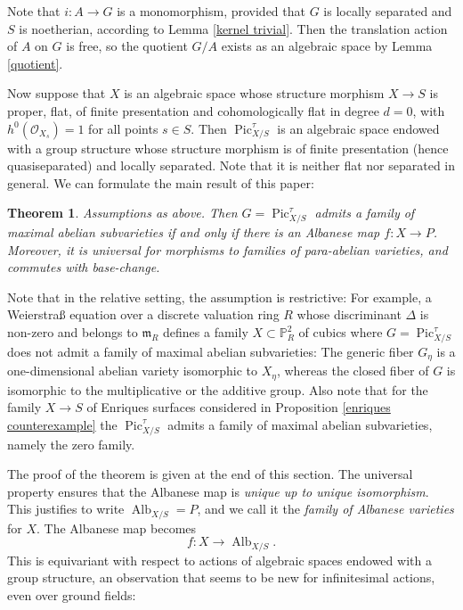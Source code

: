 \documentclass[oneside, 12pt]{amsart}
\newcommand\mylabel[1]{\label{#1}\marginpar{\raggedright\vspace{-1ex}\medskip\medskip\footnotesize \tt #1}}
\renewcommand\mylabel[1]{\label{#1}}
\newtheorem{theorem}{Theorem}[section]
\theoremstyle{definition}
\theoremstyle{remark}
\newcommand{\PP}{\mathbb{P}}
\newcommand{\Alb}{\operatorname{Alb}}
\newcommand{\lra}{\longrightarrow}
\newcommand{\maxid}{\mathfrak{m}}
\renewcommand{\O}{\mathscr{O}}
\newcommand{\Pic}{\operatorname{Pic}}
\newcommand{\ra}{\rightarrow}
\begin{document}
Note that $i:A\ra G$ is a  monomorphism, provided that $G$ is locally separated and $S$ is noetherian,
according to Lemma \ref{kernel trivial}. Then  the translation action of $A$ on $G$ is free,
so  the quotient $G/A$ exists as an algebraic space by Lemma \ref{quotient}.  

Now suppose that $X$ is an algebraic space whose structure morphism $X\ra S$ is  proper, flat, of finite presentation and  cohomologically flat
in degree $d=0$, with $h^0(\O_{X_s})=1$ for all points $s\in S$.  Then  $\Pic^\tau_{X/S}$ is an algebraic space endowed with a group structure
whose structure morphism is  of finite presentation (hence quasiseparated) and locally separated. Note that  it is neither flat nor separated in general.
We can formulate the main result of this paper:

\begin{theorem}
\mylabel{criterion albanese}
Assumptions as above. Then   $G=\Pic^\tau_{X/S}$ admits a   family of maximal abelian subvarieties if and only if 
there is an Albanese map $f:X\ra P$. Moreover, it is universal for morphisms  to families of para-abelian varieties,
and commutes with base-change.
\end{theorem}

Note that in the relative setting, the assumption is restrictive: For example, a Weierstra\ss{} equation
over a discrete valuation ring $R$ whose discriminant $\Delta$ is non-zero and belongs to $\maxid_R$
defines a family $X\subset\PP^2_R$ of cubics where $G=\Pic^\tau_{X/S}$ does not  admit a family of maximal abelian subvarieties:
The generic fiber $G_\eta$ is a one-dimensional abelian variety isomorphic to $X_\eta$, 
whereas the closed fiber of $G$ is isomorphic to the multiplicative or the additive group.
Also note that for the family $X\ra S$ of Enriques surfaces considered in Proposition \ref{enriques counterexample} 
the $\Pic^\tau_{X/S}$ admits a family of maximal abelian subvarieties, namely the zero family.

The proof  of the theorem  is given at the end of this section.
The universal property ensures that the Albanese map is \emph{unique up to unique isomorphism}.
This justifies to write $ \Alb_{X/S}=P$, and we call it  the \emph{family of Albanese varieties}
for $X$. The   Albanese map becomes
$$
f:X\lra \Alb_{X/S}.
$$
This is equivariant  with respect to actions of algebraic spaces endowed with a group structure, an observation  that seems to be new
for infinitesimal actions,  even over ground fields:
\end{document}
